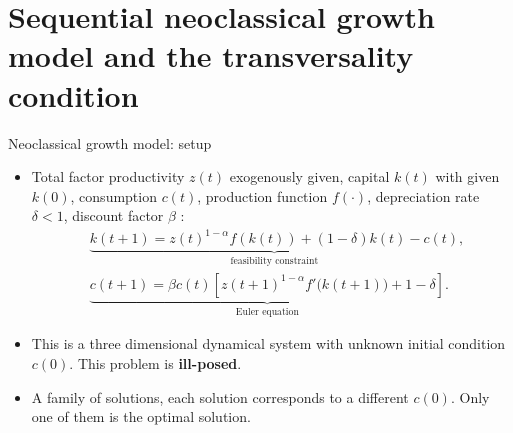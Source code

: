 \documentclass[aspectratio=169,10pt]{beamer}
\newcommand{\emphcolor}[1]{\textbf{\textcolor{emphcolorval}{#1}}}
\begin{document}
\section{\textcolor{PennBlue}{Sequential neoclassical growth model and the transversality condition }}


\begin{frame}{Neoclassical growth model: setup }
	\begin{itemize}
		\item Total factor productivity $z(t)$ exogenously given, capital $k(t)$ with given $k(0)$, consumption $c(t)$, production function $f(\cdot)$, depreciation rate $\delta<1$, discount factor $\beta$  :
		\begin{align*}
			&\underbrace{k(t+1) = z(t)^{1-\alpha} f\left(k(t)\right)+ (1-\delta)k(t)-c(t)}_{\text{feasibility constraint}}, \\ 
			&\underbrace{c(t+1) = \beta c(t) \left[z(t+1)^{1-\alpha}f'\big(k(t+1)\big)+1-\delta\right]}_{\text{Euler equation}}.
		\end{align*}
	\item This is a three dimensional dynamical system with unknown initial condition  $c(0)$. This problem is \emphcolor{ill-posed}.
	\vspace{0.05in}
	\item A family of solutions, each solution corresponds to a different $c(0)$. Only one of them is the optimal solution.
	\end{itemize}	
\end{frame}
\end{document}
